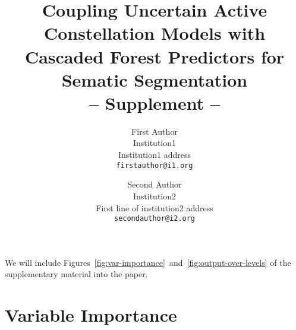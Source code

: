 \documentclass[10pt,twocolumn,letterpaper]{article}
\begin{document}
\title{Coupling Uncertain Active Constellation Models with \\
Cascaded Forest Predictors for Sematic Segmentation \\ -- Supplement --}

\author{First Author\\
Institution1\\
Institution1 address\\
{\tt\small firstauthor@i1.org}
\and
Second Author\\
Institution2\\
First line of institution2 address\\
{\tt\small secondauthor@i2.org}
}

\maketitle

We will include Figures~\ref{fig:var-importance}~and~\ref{fig:output-over-levels} of the supplementary material into the paper. 

\section{Variable Importance}
%
\begin{figure*}[t]
\begin{center}
\caption{We measure variable importance as defined in~\cite{BreimanRF}. Variable importance hints at how much worse the forest would perform (as a fraction of 1) without the respective feature. The tabel gives aggregated variable importance values for the filter bank features (1st column), the RF output (2nd column), and the smoothed RF output (3rd column). Top three rows: Our approach, three levels of the cascade. Bottom three rows: MAP instead of probabilistic inference. In the first level, only filter bank features are available. Hence the aggregated variable importance is 1 for the filter bank features, and zero otherwise. From the second level on variable importance reveals that smoothed RF output in the form of marginals is much more beneficial for the performance of the forest than the alternative MAP solution. }
\label{fig:var-importance}
\end{center}
\end{figure*}
\end{document}
